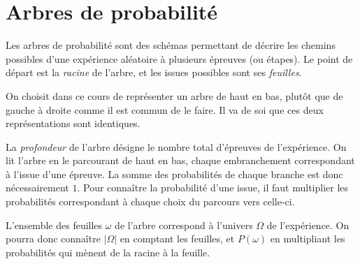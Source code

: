 \section{Arbres de probabilité}

Les arbres de probabilité sont des schémas permettant de décrire les chemins possibles d'une expérience aléatoire à plusieurs épreuves (ou étapes).
Le point de départ est la \emph{racine} de l'arbre, et les issues possibles sont ses \emph{feuilles}.

On choisit dans ce cours de représenter un arbre de haut en bas, plutôt que de gauche à droite comme il est commun de le faire.
Il va de soi que ces deux représentations sont identiques.

La \emph{profondeur} de l'arbre désigne le nombre total d'épreuves de l'expérience.
On lit l'arbre en le parcourant de haut en bas, chaque embranchement correspondant à l'issue d'une épreuve.
La somme des probabilités de chaque branche est donc nécessairement $1$.
Pour connaître la probabilité d'une issue, il faut multiplier les probabilités correspondant à chaque choix du parcours vers celle-ci.

L'ensemble des feuilles $\omega$ de l'arbre correspond à l'univers $\Omega$ de l'expérience.
On pourra donc connaître $|\Omega|$ en comptant les feuilles, et $P(\omega)$ en multipliant les probabilités qui mènent de la racine à la feuille.


